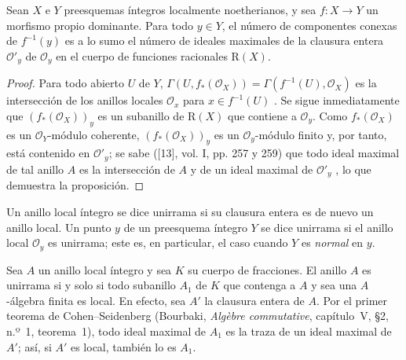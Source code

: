 \begin{proposition}[4.3.5]
\label{III.4.3.5}
\label{III.4.3.5-fr}
Sean $X$ e $Y$ preesquemas íntegros localmente noetherianos, y sea
$f:X\to Y$ un morfismo propio dominante. Para todo $y\in Y$, el
número de componentes conexas de $f^{-1}(y)$ es a lo sumo el número
de ideales maximales de la clausura entera $\mathcal O'_y$ de
$\mathcal O_y$ en el cuerpo de funciones racionales $\mathrm R(X)$.
\end{proposition}

\begin{proof}
Para todo abierto $U$ de $Y$,
$\Gamma(U,f_*(\mathcal O_X))=\Gamma(f^{-1}(U),\mathcal O_X)$
es la intersección de los anillos locales $\mathcal O_x$ para
$x\in f^{-1}(U)$ . Se sigue inmediatamente que
$(f_*(\mathcal O_X))_y$ es un subanillo de $\mathrm R(X)$ que
contiene a $\mathcal O_y$. Como $f_*(\mathcal O_X)$ es un
$\mathcal O_Y$-módulo coherente, $(f_*(\mathcal O_X))_y$ es un
$\mathcal O_y$-módulo finito y, por tanto, está contenido en $\mathcal O'_y$; se
sabe ([13], vol. I, pp. 257 y 259) que todo ideal maximal de tal anillo
$A$ es la intersección de $A$ y de un ideal maximal de $\mathcal O'_y$
\cite[vol.~I, pp.~257 and 259]{I-13}, lo que demuestra la proposición.
\end{proof}

\begin{definition}[4.3.6]
\label{III.4.3.6}
\label{III.4.3.6-fr}
Un anillo local íntegro se dice unirrama si su clausura entera
es de nuevo un anillo local. Un punto $y$ de un preesquema íntegro
$Y$ se dice unirrama si el anillo local $\mathcal O_y$ es
unirrama; este es, en particular, el caso cuando $Y$ es \emph{normal} en
$y$.
\end{definition}

Sea $A$ un anillo local íntegro y sea $K$ su cuerpo de fracciones. El
anillo $A$ es unirrama si y solo si todo subanillo $A_1$ de $K$ que
contenga a $A$ y sea una $A$-álgebra finita es local. En efecto, sea
$A'$ la clausura entera de $A$. Por el primer teorema de
Cohen--Seidenberg (Bourbaki, \emph{Alg\`ebre commutative}, capítulo~V,
\S2, n.º~1, teorema~1), todo ideal maximal de $A_1$ es la traza
de un ideal maximal de $A'$; así, si $A'$ es local, también
lo es $A_1$.


